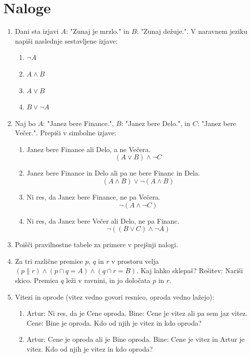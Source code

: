 \documentclass[11pt,paper=b5,footinclude,headinclude]{scrbook} %
\begin{document}
\newpage

\section{Naloge}
\begin{enumerate}
\item Dani sta izjavi $A$: "Zunaj je mrzlo." in $B$: "Zunaj dežuje.". V naravnem jeziku napiši naslednje sestavljene izjave:
\begin{enumerate}
  \item $\neg A$
  \item $A \land B$
  \item $A \lor B$
  \item $B \lor \neg A$
\end{enumerate}

\item Naj bo $A$: "Janez bere Finance.", $B$: "Janez bere Delo.", in $C$: "Janez bere Večer.".
Prepiši v simbolne izjave:
\begin{enumerate}
  \item Janez bere Finance ali Delo, a ne Večera. \[(A \lor B) \land \neg C\]
  \item Janez bere Finance in Delo ali pa ne bere Financ in Dela. \[(A \land B) \lor \neg (A \land B)\]
  \item Ni res, da Janez bere Finance, ne pa Večera. \[\neg (A \land \neg C)\]
  \item Ni res, da Janez bere Večer ali Delo, ne pa Financ. \[\neg ((B \lor C) \land \neg A)\]
\end{enumerate}

\item Poišči pravilnostne tabele za primere v prejšnji nalogi.

\item Za tri različne premice $p$, $q$ in $r$ v prostoru velja $(p \parallel r) \land (p \cap q = A) \land (q \cap r = B)$. Kaj lahko sklepaš? Rešitev: Nariši skico. Premica $q$ leži v ravnini, in jo določata $p$ in $r$.

\item Vitezi in oprode (vitez vedno govori resnico, oproda vedno lažejo):
\begin{enumerate}
  \item Artur: Ni res, da je Cene oproda.
  Bine: Cene je vitez ali pa sem jaz vitez.
  Cene: Bine je oproda.
  Kdo od njih je vitez in kdo oproda?
  \item Artur: Cene je oproda ali je Bine oproda.
  Bine: Cene je vitez in Artur je vitez.
  Kdo od njih je vitez in kdo oproda?
\end{enumerate}


\end{enumerate}
\end{document}
